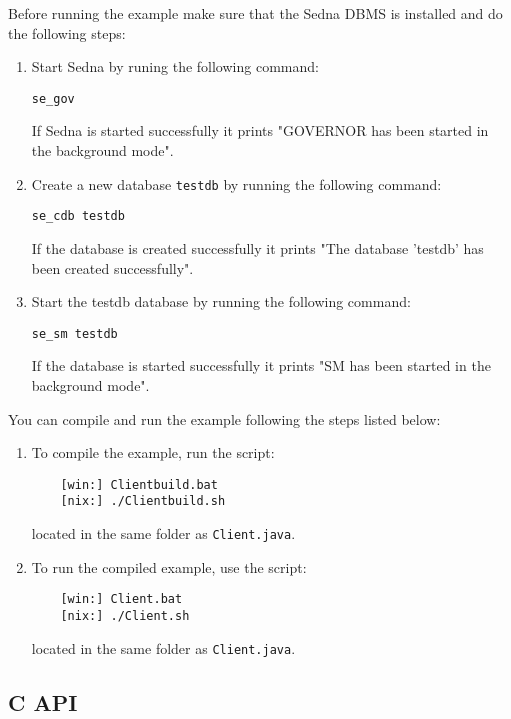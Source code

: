 \documentclass[a4paper,12pt]{article}
\begin{document}
Before running the example make sure that the Sedna DBMS is installed and do the
following steps:

\begin{enumerate}
\item Start Sedna by runing the following command:
\begin{verbatim}
se_gov
\end{verbatim}
If Sedna is started successfully it prints "GOVERNOR has been started in
the background mode".
\item Create a new database \verb!testdb! by running the following command:
\begin{verbatim}
se_cdb testdb
\end{verbatim}
If the database is created successfully it prints "The database 'testdb' has
been created successfully".
\item Start the testdb database by running the following command:
\begin{verbatim}
se_sm testdb
\end{verbatim}
If the database is started successfully it prints "SM has been started in
the background mode".
\end{enumerate}

You can compile and run the example following the steps listed below:

\begin{enumerate}
\item To compile the example, run the script:
\begin{verbatim}
    [win:] Clientbuild.bat
    [nix:] ./Clientbuild.sh
\end{verbatim}
located in the same folder as \verb!Client.java!.

\item  To run the compiled example, use the script:
\begin{verbatim}
    [win:] Client.bat
    [nix:] ./Client.sh
\end{verbatim}
located in the same folder as \verb!Client.java!.
\end{enumerate}


\subsection{C API}
\label{c-api}
\end{document}
